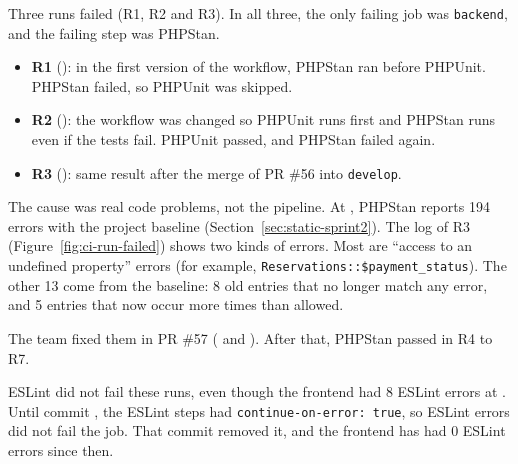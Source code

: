 Three runs failed (R1, R2 and R3).
In all three, the only failing job was \texttt{backend}, and the failing step was PHPStan.

\begin{itemize}[nosep]
  \item \textbf{R1} (): in the first version of the workflow, PHPStan ran before PHPUnit.
        PHPStan failed, so PHPUnit was skipped.
  \item \textbf{R2} (): the workflow was changed so PHPUnit runs first and PHPStan runs even if the tests fail.
        PHPUnit passed, and PHPStan failed again.
  \item \textbf{R3} (): same result after the merge of PR \#56 into \texttt{develop}.
\end{itemize}

The cause was real code problems, not the pipeline.
At , PHPStan reports 194 errors with the project baseline (Section~\ref{sec:static-sprint2}).
The log of R3 (Figure~\ref{fig:ci-run-failed}) shows two kinds of errors.
Most are ``access to an undefined property'' errors (for example, \texttt{Reservations::\$payment\_status}).
The other 13 come from the baseline: 8 old entries that no longer match any error, and 5 entries that now occur more times than allowed.


The team fixed them in PR \#57 ( and ).
After that, PHPStan passed in R4 to R7.

ESLint did not fail these runs, even though the frontend had 8 ESLint errors at .
Until commit , the ESLint steps had \texttt{continue-on-error: true}, so ESLint errors did not fail the job.
That commit removed it, and the frontend has had 0 ESLint errors since then.
